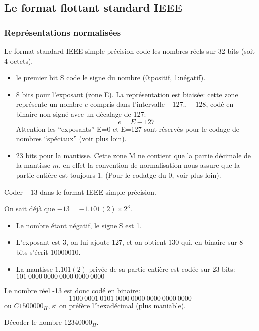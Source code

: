 \subsection{Le format flottant standard IEEE}

\subsubsection{Repr\'esentations normalis\'ees}

Le format standard IEEE simple pr\'ecision code les nombres r\'eels sur 32 bits
(soit 4 octets).
\begin{itemize}
\item le premier bit S code le signe du nombre (0:positif, 1:n\'egatif).
\item 8 bits pour l'exposant (zone E). La repr\'esentation est
biais\'ee: cette zone repr\'esente un nombre $e$ compris dans
l'intervalle $-127..+128$, cod\'e en binaire non sign\'e
avec un d\'ecalage de 127:
$$ e = E -127 $$
Attention les ``exposants'' E=0 et E=127 sont réservés pour le codage
de nombres ``spéciaux'' (voir plus loin).
\item 23 bits pour la mantisse. Cette zone M ne contient que la
partie d\'ecimale de la mantisse $m$, en effet
la convention de normalisation nous assure que la partie enti\`ere est
toujours 1. (Pour le codatge du 0, voir plus loin).
\end{itemize}


\begin{exemple}{} Coder $-13$ dans le format IEEE simple pr\'ecision.

On sait d\'ej\`a que $-13 = -1.101 (2) \times 2^3$.
\begin{itemize}
\item Le nombre \'etant  n\'egatif, le signe S est 1.
\item L'exposant est 3, on lui ajoute 127, et on obtient 130 qui,
en binaire sur 8 bits s'\'ecrit $1000 0010$.
\item La mantisse $1.101 (2)$ priv\'ee de sa partie enti\`ere est 
cod\'ee sur 23 bits: $101\ 0000\ 0000\ 0000\ 0000\ 0000$
\end{itemize}

Le nombre r\'eel -13 est donc cod\'e en binaire:
$$ 1100\ 0001\ 0101\ 0000\ 0000\ 0000\ 0000\ 0000 $$
ou $C150 0000_H$, si on pr\'ef\`ere l'hexad\'ecimal (plus maniable).
\end{exemple}

\begin{exercice}{} D\'ecoder le nombre $1234 0000_H$.
\end{exercice}

